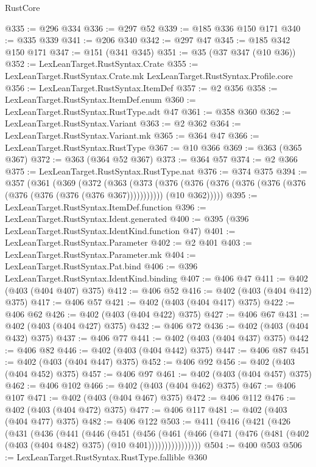 \begin{lexlean}{RustCore}
\begin{coremodule}
@335 := @296 @334
@336 := @297 @52
@339 := @185 @336 @150 @171
@340 := @335 @339
@341 := @206 @340
@342 := @297 @47
@345 := @185 @342 @150 @171
@347 := @151 (@341 @345)
@351 := @35 (@37 @347 (@10 @36))
@352 := LexLeanTarget.RustSyntax.Crate
@355 := LexLeanTarget.RustSyntax.Crate.mk LexLeanTarget.RustSyntax.Profile.core
@356 := LexLeanTarget.RustSyntax.ItemDef
@357 := @2 @356
@358 := LexLeanTarget.RustSyntax.ItemDef.enum
@360 := LexLeanTarget.RustSyntax.RustType.adt @47
@361 := @358 @360
@362 := LexLeanTarget.RustSyntax.Variant
@363 := @2 @362
@364 := LexLeanTarget.RustSyntax.Variant.mk
@365 := @364 @47
@366 := LexLeanTarget.RustSyntax.RustType
@367 := @10 @366
@369 := @363 (@365 @367)
@372 := @363 (@364 @52 @367)
@373 := @364 @57
@374 := @2 @366
@375 := LexLeanTarget.RustSyntax.RustType.nat
@376 := @374 @375
@394 := @357
    (@361
      (@369
        (@372
          (@363
            (@373 (@376 (@376 (@376 (@376 (@376 (@376 (@376 (@376 (@376 (@376 @367)))))))))))
            (@10 @362)))))
@395 := LexLeanTarget.RustSyntax.ItemDef.function
@396 := LexLeanTarget.RustSyntax.Ident.generated
@400 := @395 (@396 LexLeanTarget.RustSyntax.IdentKind.function @47)
@401 := LexLeanTarget.RustSyntax.Parameter
@402 := @2 @401
@403 := LexLeanTarget.RustSyntax.Parameter.mk
@404 := LexLeanTarget.RustSyntax.Pat.bind
@406 := @396 LexLeanTarget.RustSyntax.IdentKind.binding
@407 := @406 @47
@411 := @402 (@403 (@404 @407) @375)
@412 := @406 @52
@416 := @402 (@403 (@404 @412) @375)
@417 := @406 @57
@421 := @402 (@403 (@404 @417) @375)
@422 := @406 @62
@426 := @402 (@403 (@404 @422) @375)
@427 := @406 @67
@431 := @402 (@403 (@404 @427) @375)
@432 := @406 @72
@436 := @402 (@403 (@404 @432) @375)
@437 := @406 @77
@441 := @402 (@403 (@404 @437) @375)
@442 := @406 @82
@446 := @402 (@403 (@404 @442) @375)
@447 := @406 @87
@451 := @402 (@403 (@404 @447) @375)
@452 := @406 @92
@456 := @402 (@403 (@404 @452) @375)
@457 := @406 @97
@461 := @402 (@403 (@404 @457) @375)
@462 := @406 @102
@466 := @402 (@403 (@404 @462) @375)
@467 := @406 @107
@471 := @402 (@403 (@404 @467) @375)
@472 := @406 @112
@476 := @402 (@403 (@404 @472) @375)
@477 := @406 @117
@481 := @402 (@403 (@404 @477) @375)
@482 := @406 @122
@503 := @411
    (@416
      (@421
        (@426
          (@431
            (@436
              (@441
                (@446
                  (@451
                    (@456
                      (@461
                        (@466
                          (@471 (@476 (@481 (@402 (@403 (@404 @482) @375) (@10 @401))))))))))))))))
@504 := @400 @503
@506 := LexLeanTarget.RustSyntax.RustType.fallible @360

\end{coremodule}
\end{lexlean}
